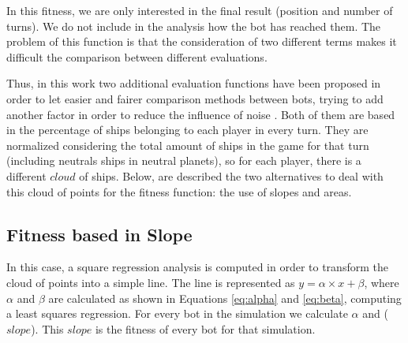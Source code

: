 \documentclass[preprint]{elsarticle}
\begin{document}

In this fitness, we are only interested in the final result (position and number of turns). We do not include in the analysis how the bot has reached them. The problem of this function is that the consideration of two different terms makes it difficult the comparison between different evaluations. 

Thus, in this work two additional evaluation functions have been proposed in order to let easier and fairer comparison methods between bots, trying to add another factor in order to reduce the influence of noise \cite{Mora_noisy_jcst}.
Both of them are based in the percentage of ships belonging to each player in every turn. They are normalized considering the total amount of ships in the game for that turn (including neutrals ships in neutral planets), so for each player, there is a different {$cloud$} of ships.
%
Below, are described the two alternatives to deal with this cloud of points for the fitness function: the use of slopes and areas.


\subsection{Fitness based in Slope}
\label{subsec:fitness_slope}

In this case, a square regression analysis is computed in order to transform the cloud of points into a simple line. The line is represented as {$y = \alpha \times x + \beta $}, where {$\alpha$} and {$\beta$} are calculated as shown in Equations \ref{eq:alpha} and \ref{eq:beta}, computing a least squares regression. For every bot in the simulation we calculate $\alpha$ and ($slope$). This $slope$ is the fitness of every bot for that simulation. 
\end{document}
